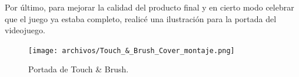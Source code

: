 \vspace{0.5cm}

Por último, para mejorar la calidad del producto final y en cierto modo celebrar que el juego ya estaba completo, realicé una ilustración para la portada del videojuego.

\vspace{0.5cm}

\begin{figure}[htbp]
\centering
  \texttt{[image: archivos/Touch\_\&\_Brush\_Cover\_montaje.png]}
  \caption{Portada de Touch \& Brush.}
  \label{fig:cover}
\end{figure}

